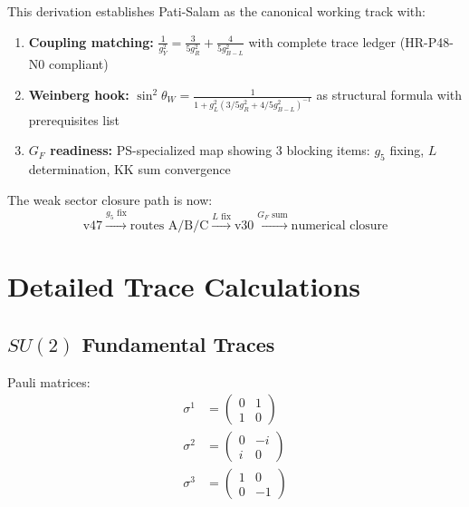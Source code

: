 \documentclass[11pt,a4paper]{article}
\begin{document}
This derivation establishes Pati-Salam as the canonical working track with:

\begin{enumerate}
\item \textbf{Coupling matching:} $\frac{1}{g_Y^2} = \frac{3}{5 g_R^2} + \frac{4}{5 g_{B-L}^2}$
with complete trace ledger (HR-P48-N0 compliant)

\item \textbf{Weinberg hook:} $\sin^2\theta_W = \frac{1}{1 + g_L^2(3/5g_R^2 + 4/5g_{B-L}^2)^{-1}}$
as structural formula with prerequisites list

\item \textbf{$G_F$ readiness:} PS-specialized map showing 3 blocking items:
$g_5$ fixing, $L$ determination, KK sum convergence
\end{enumerate}

The weak sector closure path is now:
\begin{equation}
\label{eq:closure-path}
\text{v47} \xrightarrow{g_5 \text{ fix}} \text{routes A/B/C} \xrightarrow{L \text{ fix}} \text{v30} \xrightarrow{G_F \text{ sum}} \text{numerical closure}
\end{equation}

\appendix

\section{Detailed Trace Calculations}
\label{app:traces}

\subsection{$SU(2)$ Fundamental Traces}
\label{app:su2-traces}

Pauli matrices:
\begin{align}
\label{eq:pauli-1}
\sigma^1 &= \begin{pmatrix} 0 & 1 \\ 1 & 0 \end{pmatrix} \\
\label{eq:pauli-2}
\sigma^2 &= \begin{pmatrix} 0 & -i \\ i & 0 \end{pmatrix} \\
\label{eq:pauli-3}
\sigma^3 &= \begin{pmatrix} 1 & 0 \\ 0 & -1 \end{pmatrix}
\end{align}
\end{document}
